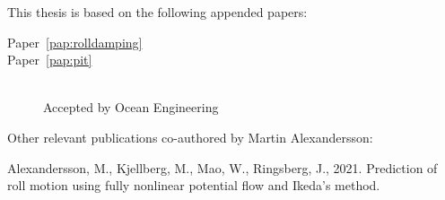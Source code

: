 

This thesis is based on the following appended papers:

\begin{description}
\item[Paper~\ref{pap:rolldamping}]
\begin{minipage}[adjusting]{0.85\textwidth}
\end{minipage}

\item[Paper~\ref{pap:pit}]
\begin{minipage}[adjusting]{0.85\textwidth}
\\
Accepted by Ocean Engineering
\end{minipage}

\end{description}

\vspace{1cm}

\noindent Other relevant publications co-authored by Martin Alexandersson:
\begin{description}
\normalsize
\newcommand{\ME}{{\bfseries Martin Alexandersson}}

\item
{}

\item
Alexandersson, M., Kjellberg, M., Mao, W., Ringsberg, J., 2021. Prediction of roll motion using fully nonlinear potential flow and Ikeda’s method.

\end{description}

